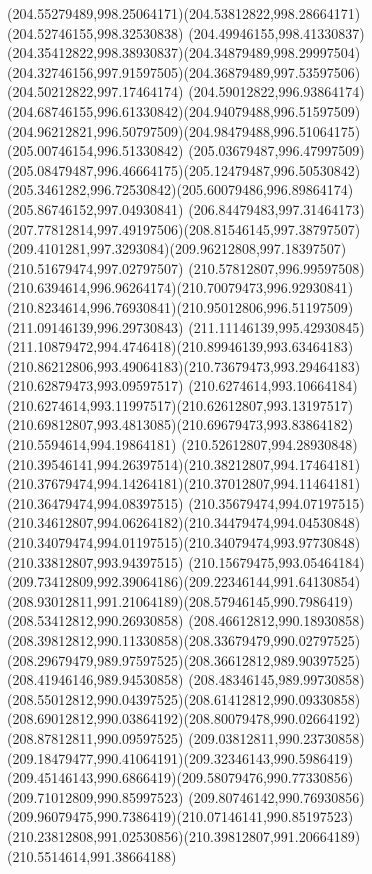 {{	\curveto(204.55279489,998.25064171)(204.53812822,998.28664171)(204.52746155,998.32530838)
	\curveto(204.49946155,998.41330837)(204.35412822,998.38930837)(204.34879489,998.29997504)
	\curveto(204.32746156,997.91597505)(204.36879489,997.53597506)(204.50212822,997.17464174)
	\curveto(204.59012822,996.93864174)(204.68746155,996.61330842)(204.94079488,996.51597509)
	\curveto(204.96212821,996.50797509)(204.98479488,996.51064175)(205.00746154,996.51330842)
	\curveto(205.03679487,996.47997509)(205.08479487,996.46664175)(205.12479487,996.50530842)
	\curveto(205.3461282,996.72530842)(205.60079486,996.89864174)(205.86746152,997.04930841)
	\curveto(206.84479483,997.31464173)(207.77812814,997.49197506)(208.81546145,997.38797507)
	\curveto(209.4101281,997.3293084)(209.96212808,997.18397507)(210.51679474,997.02797507)
	\curveto(210.57812807,996.99597508)(210.6394614,996.96264174)(210.70079473,996.92930841)
	\curveto(210.8234614,996.76930841)(210.95012806,996.51197509)(211.09146139,996.29730843)
	\curveto(211.11146139,995.42930845)(211.10879472,994.4746418)(210.89946139,993.63464183)
	\curveto(210.86212806,993.49064183)(210.73679473,993.29464183)(210.62879473,993.09597517)
	\curveto(210.6274614,993.10664184)(210.6274614,993.11997517)(210.62612807,993.13197517)
	\curveto(210.69812807,993.4813085)(210.69679473,993.83864182)(210.5594614,994.19864181)
	\curveto(210.52612807,994.28930848)(210.39546141,994.26397514)(210.38212807,994.17464181)
	\curveto(210.37679474,994.14264181)(210.37012807,994.11464181)(210.36479474,994.08397515)
	\curveto(210.35679474,994.07197515)(210.34612807,994.06264182)(210.34479474,994.04530848)
	\curveto(210.34079474,994.01197515)(210.34079474,993.97730848)(210.33812807,993.94397515)
	\curveto(210.15679475,993.05464184)(209.73412809,992.39064186)(209.22346144,991.64130854)
	\curveto(208.93012811,991.21064189)(208.57946145,990.7986419)(208.53412812,990.26930858)
	\curveto(208.46612812,990.18930858)(208.39812812,990.11330858)(208.33679479,990.02797525)
	\curveto(208.29679479,989.97597525)(208.36612812,989.90397525)(208.41946146,989.94530858)
	\curveto(208.48346145,989.99730858)(208.55012812,990.04397525)(208.61412812,990.09330858)
	\curveto(208.69012812,990.03864192)(208.80079478,990.02664192)(208.87812811,990.09597525)
	\curveto(209.03812811,990.23730858)(209.18479477,990.41064191)(209.32346143,990.5986419)
	\curveto(209.45146143,990.6866419)(209.58079476,990.77330856)(209.71012809,990.85997523)
	\curveto(209.80746142,990.76930856)(209.96079475,990.7386419)(210.07146141,990.85197523)
	\curveto(210.23812808,991.02530856)(210.39812807,991.20664189)(210.5514614,991.38664188)
}}
